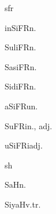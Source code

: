 \begin{multicols*}{2}
\begin{dictroot}{s}{fr}
\begin{dictentry}{inSiFR}{n.}
{        }
    \end{dictentry}
    \begin{dictentry}{SuliFR}{n.}
    \end{dictentry}
    \begin{dictentry}{SasiFR}{n.}
    \end{dictentry}
    \begin{dictentry}{SidiFR}{n.}
    \end{dictentry}
    \begin{dictentry}{aSiFRu}{n.}
    \end{dictentry}
    \begin{dictentry}{SuFRi}{n., adj.}
    \end{dictentry}
    \begin{dictentry}{uSiFRi}{adj.}
    \end{dictentry}
\end{dictroot}

\begin{dictroot}{s}{h}
    \begin{dictentry}{SaH}{n.}
    \end{dictentry}
    \begin{dictentry}{SiyaH}{v.tr.}
    \end{dictentry}
\end{dictroot}


\end{multicols*}
